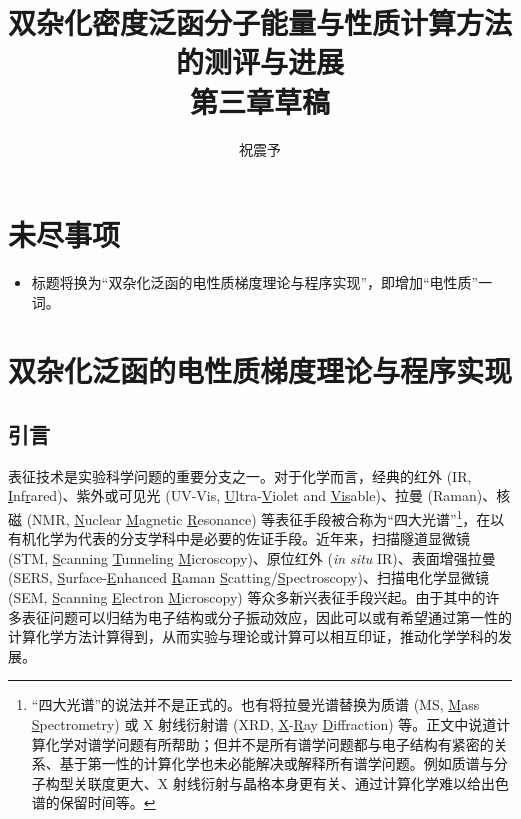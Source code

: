 



\title{\textbf{双杂化密度泛函分子能量与性质计算方法的测评与进展\\第三章草稿}}
\author{祝震予}
\maketitle
\vspace{-10pt}

\tableofcontents


\section*{未尽事项}

\begin{itemize}
  \item \alert{标题将换为“双杂化泛函的电性质梯度理论与程序实现”，即增加“电性质”一词。}
\end{itemize}

\setcounter{section}{2}

\newpage

\section{双杂化泛函的电性质梯度理论与程序实现}

\subsection{引言}

表征技术是实验科学问题的重要分支之一。对于化学而言，经典的红外 (IR, \underline{I}nf\underline{r}ared)、紫外或可见光 (UV-Vis, \underline{U}ltra-\underline{V}iolet and \underline{Vis}able)、拉曼 (Raman)、核磁 (NMR, \underline{N}uclear \underline{M}agnetic \underline{R}esonance) 等表征手段被合称为“四大光谱”\footnote{“四大光谱”的说法并不是正式的。也有将拉曼光谱替换为质谱 (MS, \underline{M}ass \underline{S}pectrometry) 或 X 射线衍射谱 (XRD, \underline{X}-\underline{R}ay \underline{D}iffraction) 等。正文中说道计算化学对谱学问题有所帮助；但并不是所有谱学问题都与电子结构有紧密的关系、基于第一性的计算化学也未必能解决或解释所有谱学问题。例如质谱与分子构型关联度更大、X 射线衍射与晶格本身更有关、通过计算化学难以给出色谱的保留时间等。}，在以有机化学为代表的分支学科中是必要的佐证手段。近年来，扫描隧道显微镜 (STM, \underline{S}canning \underline{T}unneling \underline{M}icroscopy)、原位红外 (\emph{in situ} IR)、表面增强拉曼 (SERS, \underline{S}urface-\underline{E}nhanced \underline{R}aman \underline{S}catting/\underline{S}pectroscopy)、扫描电化学显微镜 (SEM, \underline{S}canning \underline{E}lectron \underline{M}icroscopy) 等众多新兴表征手段兴起。由于其中的许多表征问题可以归结为电子结构或分子振动效应，因此可以或有希望通过第一性的计算化学方法计算得到，从而实验与理论或计算可以相互印证，推动化学学科的发展。

